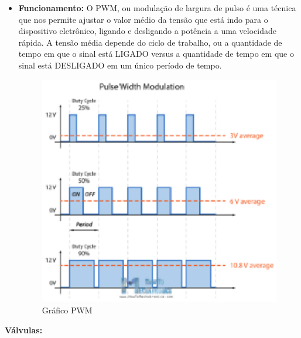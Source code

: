 \begin{itemize}
    \item \textbf{Funcionamento:} O PWM, ou modulação de largura de pulso é uma técnica que nos permite ajustar o valor médio da tensão que está indo para o dispositivo eletrônico, ligando e desligando a potência a uma velocidade rápida. A tensão média depende do ciclo de trabalho, ou a quantidade de tempo em que o sinal está LIGADO versus a quantidade de tempo em que o sinal está DESLIGADO em um único período de tempo.

    \begin{figure}[hb]                  
        \centering                          
        \includegraphics[scale=1]{figuras/pwm1.eps}
        \caption{ Gráfico PWM }   \label{figpwm}              
    \end{figure}
    
\end{itemize}
\newpage
\textbf{Válvulas:}
